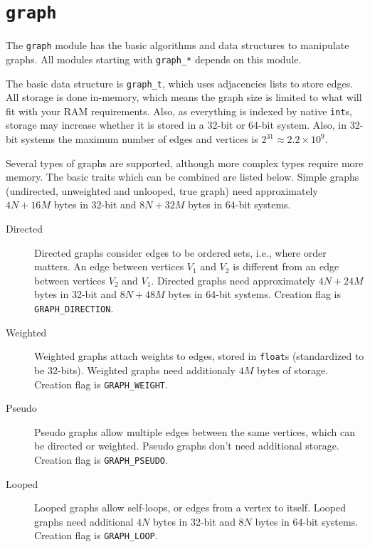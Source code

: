 \section{\texttt{graph}}

The \texttt{graph} module has the basic algorithms and data structures to manipulate graphs. All modules starting with \texttt{graph\_*} depends on this module.

The basic data structure is \texttt{graph\_t}, which uses adjacencies lists to store edges. All storage is done in-memory, which means the graph size is limited to 
what will fit with your RAM requirements. Also, as everything is indexed by native \texttt{int}s, storage may increase whether it is stored in a 32-bit or 64-bit system.
Also, in 32-bit systems the maximum number of edges and vertices is $2^{31} \approx 2.2 \times 10^9$.

Several types of graphs are supported, although more complex types require more memory. The basic traits which can be combined are listed below. Simple graphs 
(undirected, unweighted and unlooped, true graph) need approximately $4N+16M$ bytes in 32-bit and $8N + 32M$ bytes in 64-bit systems.

\begin{description}
 \item[Directed] Directed graphs consider edges to be ordered sets, i.e., where order matters. An edge between vertices $V_1$ and $V_2$ is different from an edge between
 vertices $V_2$ and $V_1$. Directed graphs need approximately $4N + 24M$ bytes in 32-bit and $8N + 48M$ bytes in 64-bit systems. 
  Creation flag is \texttt{GRAPH\_DIRECTION}.
 
 \item[Weighted] Weighted graphs attach weights to edges, stored in \texttt{float}s (standardized to be 32-bits). Weighted graphs need additionaly $4M$ bytes of storage.
 Creation flag is \texttt{GRAPH\_WEIGHT}.
 
 \item[Pseudo] Pseudo graphs allow multiple edges between the same vertices, which can be directed or weighted. Pseudo graphs don't need additional storage.
 Creation flag is \texttt{GRAPH\_PSEUDO}.
 
 \item[Looped] Looped graphs allow self-loops, or edges from a vertex to itself. Looped graphs need additional $4N$ bytes in 32-bit and $8N$ bytes in 64-bit systems.
 Creation flag is \texttt{GRAPH\_LOOP}.
\end{description}

